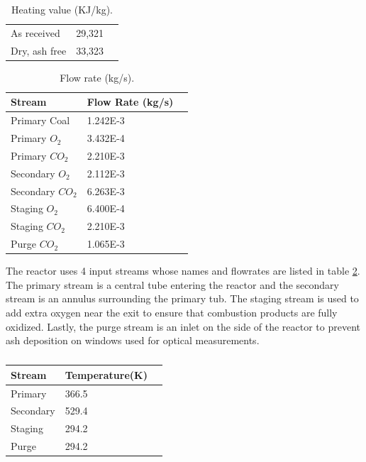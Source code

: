 \documentclass[12pt]{wssci}
\begin{document}
\begin{table}[!h]
	\caption{Heating value (KJ/kg).}
	\label{t:heat}
	\centering
	\begin{tabular}{l l l}
	\hline
	
	As received & 29,321 \\ 
    Dry, ash free & 33,323 \\ 
\hline
\end{tabular}
\end{table}


\begin{table}[!h]
	\caption{Flow rate (kg/s).}
	\label{t:flowrates}
	\centering
	\begin{tabular}{l l l}
	\hline
	Stream & Flow Rate (kg/s)  \\ \hline
	Primary Coal & 1.242E-3  \\ 
    Primary $O_2$ & 3.432E-4\\ 
    Primary $CO_2$ & 2.210E-3  \\ 
    
    Secondary $O_2$ & 2.112E-3 \\ 
    Secondary $CO_2$ & 6.263E-3  \\ 
    Staging $O_2$ & 6.400E-4\\ 
    Staging $CO_2$ & 2.210E-3  \\
    Purge $CO_2$  & 1.065E-3  \\ 
	
\hline
\end{tabular}
\end{table}

The reactor uses 4 input streams whose names and flowrates are listed in table \ref{t:flowrates}.  The primary stream is a central tube entering the reactor and the secondary stream is an annulus surrounding the primary tub.  The staging stream is used to add extra oxygen near the exit to ensure that combustion products are fully oxidized.  Lastly, the purge stream is an inlet on the side of the reactor to prevent ash deposition on windows used for optical measurements.  

\begin{table}[!h]
	\caption{}
	\label{t:stream_temperatures}
	\centering
	\begin{tabular}{l l l}
	\hline
	Stream & Temperature(K) \\ \hline
    Primary & 366.5 \\ 
    Secondary & 529.4  \\ 
    Staging  & 294.2 \\ 
    Purge  & 294.2 \\ 
	
\hline
\end{tabular}
\end{table}
\end{document}
